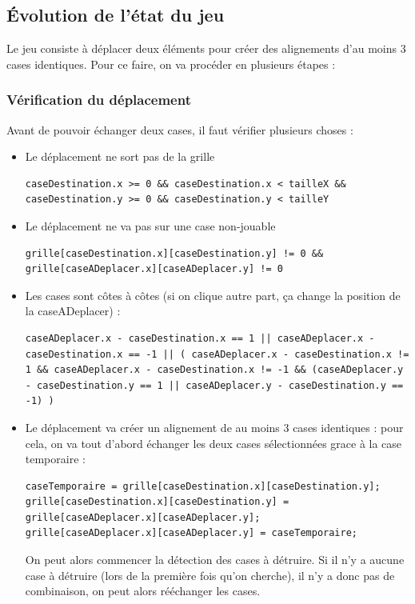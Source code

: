 \subsection{Évolution de l'état du jeu}

Le jeu consiste à déplacer deux éléments pour créer des alignements d'au moins 3 cases identiques. Pour ce faire, on va procéder en plusieurs étapes :

\subsubsection{Vérification du déplacement}
Avant de pouvoir échanger deux cases, il faut vérifier plusieurs choses :
\begin{itemize}
	\item
		Le déplacement ne sort pas de la grille
\begin{lstlisting}
caseDestination.x >= 0 && caseDestination.x < tailleX && caseDestination.y >= 0 && caseDestination.y < tailleY
\end{lstlisting}
	\item
		Le déplacement ne va pas sur une case non-jouable
\begin{lstlisting}
grille[caseDestination.x][caseDestination.y] != 0 && grille[caseADeplacer.x][caseADeplacer.y] != 0
\end{lstlisting}
	\item
		Les cases sont côtes à côtes (si on clique autre part, ça change la position de la caseADeplacer) :
\begin{lstlisting}
caseADeplacer.x - caseDestination.x == 1 || caseADeplacer.x - caseDestination.x == -1 || ( caseADeplacer.x - caseDestination.x != 1 && caseADeplacer.x - caseDestination.x != -1 && (caseADeplacer.y - caseDestination.y == 1 || caseADeplacer.y - caseDestination.y == -1) )
\end{lstlisting}
	\item
		Le déplacement va créer un alignement de au moins 3 cases identiques : pour cela, on va tout d'abord échanger les deux cases sélectionnées grace à la case temporaire :
\begin{lstlisting}
caseTemporaire = grille[caseDestination.x][caseDestination.y];
grille[caseDestination.x][caseDestination.y] = grille[caseADeplacer.x][caseADeplacer.y];
grille[caseADeplacer.x][caseADeplacer.y] = caseTemporaire;
\end{lstlisting}
		On peut alors commencer la détection des cases à détruire. Si il n'y a aucune case à détruire (lors de la première fois qu'on cherche), il n'y a donc pas de combinaison, on peut alors rééchanger les cases.
\end{itemize}


